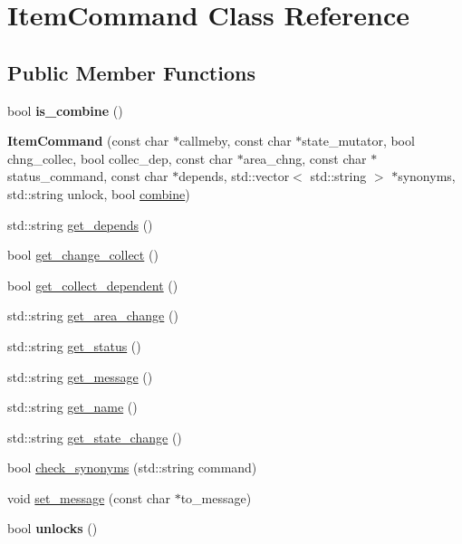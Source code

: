 \hypertarget{class_item_command}{
\section{\-Item\-Command \-Class \-Reference}
\label{class_item_command}
}
\subsection*{\-Public \-Member \-Functions}
\begin{DoxyCompactItemize}
\item 
\hypertarget{class_item_command_a71023af77dc1cae418995588e1fead9d}{
bool {\bfseries is\-\_\-combine} ()}
\label{class_item_command_a71023af77dc1cae418995588e1fead9d}

\item 
\hypertarget{class_item_command_adb0c6cc33fce1d745c9da4b6d1796367}{
{\bfseries \-Item\-Command} (const char $\ast$callmeby, const char $\ast$state\-\_\-mutator, bool chng\-\_\-collec, bool collec\-\_\-dep, const char $\ast$area\-\_\-chng, const char $\ast$status\-\_\-command, const char $\ast$depends, std\-::vector$<$ std\-::string $>$ $\ast$synonyms, std\-::string unlock, bool \hyperlink{classcombine}{combine})}
\label{class_item_command_adb0c6cc33fce1d745c9da4b6d1796367}

\item 
std\-::string \hyperlink{class_item_command_aab2f239abd8e51eed941a7144c5a20f0}{get\-\_\-depends} ()
\item 
bool \hyperlink{class_item_command_a076738abba7d76c8b5e28f42e11b6df5}{get\-\_\-change\-\_\-collect} ()
\item 
bool \hyperlink{class_item_command_a478d2e1a02ea0b44e41e3d15e59e2156}{get\-\_\-collect\-\_\-dependent} ()
\item 
std\-::string \hyperlink{class_item_command_ac40efb86e5eab9229d2c343b308b6fa5}{get\-\_\-area\-\_\-change} ()
\item 
std\-::string \hyperlink{class_item_command_ad0a8c59554e3d4a7a14299fd7df8dc70}{get\-\_\-status} ()
\item 
std\-::string \hyperlink{class_item_command_a81079b514b0785ce9c86f8618f096c18}{get\-\_\-message} ()
\item 
std\-::string \hyperlink{class_item_command_ad19f0634b23480fcae2f05ee1a0f13f1}{get\-\_\-name} ()
\item 
std\-::string \hyperlink{class_item_command_aad1e85e694f5cd16cc11ad5acda2884e}{get\-\_\-state\-\_\-change} ()
\item 
bool \hyperlink{class_item_command_a7e2827365e9a8521fded9334cb53fb7f}{check\-\_\-synonyms} (std\-::string command)
\item 
void \hyperlink{class_item_command_abe177c8696e00480a716959b335ebca8}{set\-\_\-message} (const char $\ast$to\-\_\-message)
\item 
\hypertarget{class_item_command_a74c82a6f88120d2ccaa6fbba4353fe17}{
bool {\bfseries unlocks} ()}
\label{class_item_command_a74c82a6f88120d2ccaa6fbba4353fe17}


\end{DoxyCompactItemize}
